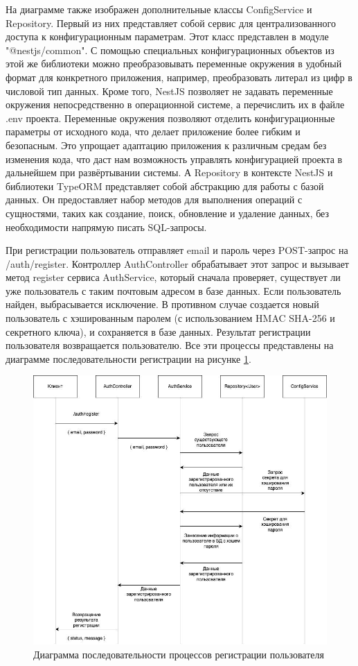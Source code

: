 	На диаграмме также изображен дополнительные классы ConfigService и Repository. Первый из них представляет собой сервис для централизованного доступа к конфигурационным параметрам. Этот класс представлен в модуле "@nestjs/common". С помощью специальных конфигурационных объектов из этой же библиотеки можно преобразовывать переменные окружения в удобный формат для конкретного приложения, например, преобразовать литерал из цифр в числовой тип данных. Кроме того, NestJS позволяет не задавать переменные окружения непосредственно в операционной системе, а перечислить их в файле .env проекта. Переменные окружения позволяют отделить конфигурационные параметры от исходного кода, что делает приложение более гибким и безопасным. Это упрощает адаптацию приложения к различным средам без изменения кода, что даст нам возможность управлять конфигурацией проекта в дальнейшем при развёртывании системы. А Repository в контексте NestJS и библиотеки TypeORM представляет собой абстракцию для работы с базой данных. Он предоставляет набор методов для выполнения операций с сущностями, таких как создание, поиск, обновление и удаление данных, без необходимости напрямую писать SQL-запросы.

	При регистрации пользователь отправляет email и пароль через POST-запрос на /auth/register. Контроллер AuthController обрабатывает этот запрос и вызывает метод register сервиса AuthService, который сначала проверяет, существует ли уже пользователь с таким почтовым адресом в базе данных. Если пользователь найден, выбрасывается исключение. В противном случае создается новый пользователь с хэшированным паролем (с использованием HMAC SHA-256 и секретного ключа), и сохраняется в базе данных. Результат регистрации пользователя возвращается пользователю. Все эти процессы представлены на диаграмме последовательности регистрации на рисунке \ref{fig:register_processes}.

	\begin{figure}[ht!] 
		\center
		\includegraphics [scale=0.37] {my_folder/images//register_processes}
		\caption{Диаграмма последовательности процессов регистрации пользователя} 
		\label{fig:register_processes}  
	\end{figure}

